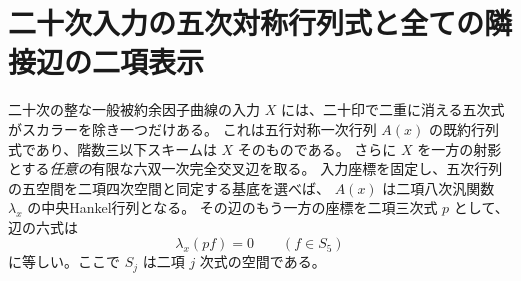 \section{二十次入力の五次対称行列式と全ての隣接辺の二項表示}
\label{sec:quadric-conductor-quintic}
\begin{theorem}\label{thm:quadric-conductor-quintic}
二十次の整な一般被約余因子曲線の入力 $X$ には、二十印で二重に消える五次式がスカラーを除き一つだけある。
これは五行対称一次行列 $A(x)$ の既約行列式であり、階数三以下スキームは $X$ そのものである。
さらに $X$ を一方の射影とする\emph{任意の}有限な六双一次完全交叉辺を取る。
入力座標を固定し、五次行列の五空間を二項四次空間と同定する基底を選べば、
$A(x)$ は二項八次汎関数 $\lambda_x$ の中央Hankel行列となる。
その辺のもう一方の座標を二項三次式 $p$ として、辺の六式は
\[
                   \lambda_x(p f)=0\qquad(f\in S_5)
\]
に等しい。ここで $S_j$ は二項 $j$ 次式の空間である。
\end{theorem}
